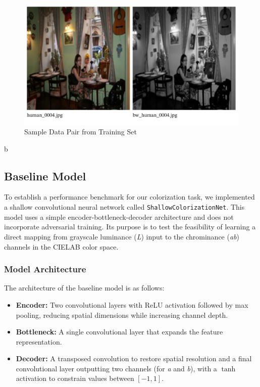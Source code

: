 \documentclass{article} %
\begin{document}
\begin{figure}[htbp]            %
  \centering
  \includegraphics[width=0.65\linewidth]{Figs/Data Example.png}
  \caption{Sample Data Pair from Training Set}
  \label{fig:data_example}
\end{figure}b

\subsection{Baseline Model}

To establish a performance benchmark for our colorization task, we implemented a shallow convolutional neural network called \texttt{ShallowColorizationNet}. This model uses a simple 
encoder-bottleneck-decoder architecture and does not incorporate adversarial training. Its purpose is to test the feasibility of learning a direct mapping from grayscale luminance (\textit{L}) 
input to the chrominance (\textit{ab}) channels in the CIELAB color space.

\subsubsection{Model Architecture}

The architecture of the baseline model is as follows:
\begin{itemize}
    \item \textbf{Encoder:} Two convolutional layers with ReLU activation followed by max pooling, reducing spatial dimensions while increasing channel depth.
    \item \textbf{Bottleneck:} A single convolutional layer that expands the feature representation.
    \item \textbf{Decoder:} A transposed convolution to restore spatial resolution and a final convolutional layer outputting two channels (for \textit{a} and \textit{b}), with a $\tanh$ 
    activation to constrain values between $[-1, 1]$.
\end{itemize}
\end{document}
